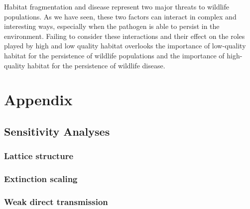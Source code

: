 \documentclass{svjour3}
\begin{document}
Habitat fragmentation and disease represent two major threats to wildlife populations.  As we have seen, these two factors can interact in complex and interesting ways, especially when the pathogen is able to persist in the environment.  Failing to consider these interactions and their effect on the roles played by high and low quality habitat overlooks the importance of low-quality habitat for the persistence of wildlife populations and the importance of high-quality habitat for the persistence of wildlife disease.

\clearpage

\section{Appendix}

\subsection{Sensitivity Analyses}

\subsubsection{Lattice structure}

\subsubsection{Extinction scaling}

\subsubsection{Weak direct transmission}


     
\end{document}
